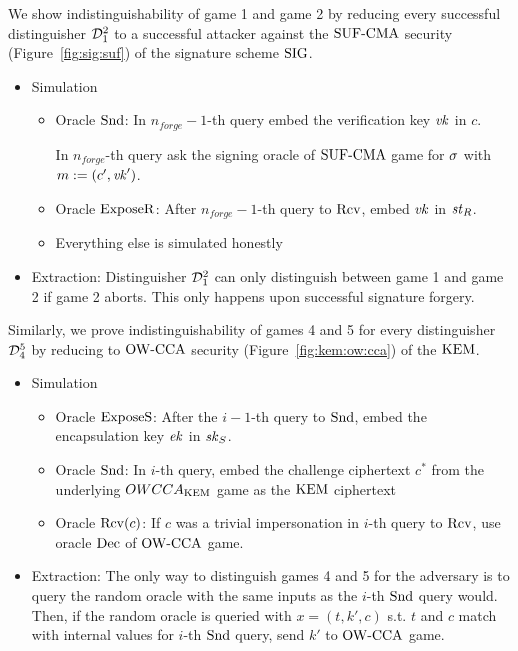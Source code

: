 We show indistinguishability of game 1 and game 2 by reducing every successful distinguisher $\mathcal{D}_1^2$ to a successful attacker against the ${\mathrm{SUF}\text{-}\mathrm{CMA}}$ security (Figure~\ref{fig:sig:suf}) of the signature scheme $\mathrm{SIG}$.

\begin{itemize}
    \item Simulation
    \begin{itemize}
        \item Oracle $\mathrm{Snd}$: 
        In $n_{forge}-1$-th query embed the verification key $\mathit{vk}$ in $c$.\par
        In $n_{forge}$-th query ask the signing oracle of ${\mathrm{SUF}\text{-}\mathrm{CMA}}$ game for $\sigma$ with $m:=(c',\mathit{vk}')$.
        \item  Oracle $\mathrm{ExposeR}$: 
        After $n_{forge}-1$-th query to $\mathrm{Rcv}$, embed $\mathit{vk}$ in $\mathit{st}_R$.
        \item Everything else is simulated honestly
    \end{itemize}
    \item Extraction: Distinguisher $\mathcal{D}_1^2$ can only distinguish between game 1 and game 2 if game 2 aborts.
    This only happens upon successful signature forgery.
\end{itemize}

Similarly, we prove indistinguishability of games 4 and 5 for every distinguisher $\mathcal{D}_4^5$ by reducing to ${\mathrm{OW}\text{-}\mathrm{CCA}}$ security (Figure~\ref{fig:kem:ow:cca}) of the $\mathrm{KEM}$.

\begin{itemize}
    \item Simulation
    \begin{itemize}
        \item Oracle $\mathrm{ExposeS}$: 
        After the $i-1$-th query to $\mathrm{Snd}$, embed the encapsulation key $\mathit{ek}$ in $\mathit{sk}_S$.
        \item  Oracle $\mathrm{Snd}$: 
        In $i$-th query, embed the challenge ciphertext $c^*$ from the underlying $OWCCA_{\mathrm{KEM}}$ game as the $\mathrm{KEM}$ ciphertext 
        \item Oracle $\mathrm{Rcv}(c)$: If $c$ was a trivial impersonation in $i$-th query to $\mathrm{Rcv}$, use oracle $\mathrm{Dec}$ of ${\mathrm{OW}\text{-}\mathrm{CCA}}$ game.
    \end{itemize}
    \item Extraction: The only way to distinguish games 4 and 5 for the adversary is to query the random oracle with the same inputs as the $i$-th $\mathrm{Snd}$ query would.
    Then, if the random oracle is queried with $x=(t,k',c)$ s.t. $t$ and $c$ match with internal values for $i$-th $\mathrm{Snd}$ query, send $k'$ to ${\mathrm{OW}\text{-}\mathrm{CCA}}$ game.
\end{itemize}

